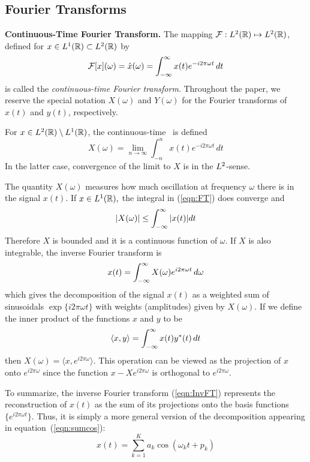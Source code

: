 \subsection{Fourier Transforms}
\label{sec:Fourier}
\begin{define}{\bf Continuous-Time Fourier Transform. } 
The mapping $\mathcal{F}: L^2(\mathbb{R}) \mapsto L^2(\mathbb{R})$, defined for
$x\in L^1(\mathbb{R}) \subset L^2(\mathbb{R})$ by
\begin{equation}
\label{eqn:FT}
\mathcal{F}[x](\omega) = \hat{x}(\omega) = \int_{-\infty}^{\infty} x(t) e^{-i2\pi\omega t}\,dt
\end{equation}
is called the \emph{continuous-time Fourier transform}.  Throughout
the paper, we reserve the special notation $X(\omega)$ and $Y(\omega)$
for the Fourier transforms of $x(t)$ and $y(t)$, respectively.

For $x \in L^2(\mathbb{R}) \setminus L^1(\mathbb{R})$, the continuous-time \FT\ is defined
\[
X(\omega) = 
\lim_{n\rightarrow \infty}\int_{-n}^n x(t) e^{-i2\pi\omega t}\, dt
\]
In the latter case, convergence of the limit to $X$ is in the
$L^2$-sense.
\end{define}
The quantity $X(\omega)$ measures how much oscillation at
frequency $\omega$ there is in the signal $x(t)$.
If $x \in L^1(\mathbb{R}),$ the integral in (\ref{eqn:FT}) does converge and 
\[|X(\omega)| \leq \int_{-\infty}^{\infty} |x(t)|dt \]
Therefore $X$ is bounded and it is a continuous function of $\omega.$
If $X$ is also integrable, the inverse Fourier transform is 
\begin{equation}
\label{eqn:InvFT}
x(t) = %
\integral X(\omega) e^{i2\pi\omega t} \,d\omega
\end{equation}
which gives the decomposition of the signal $x(t)$ as a weighted sum of sinusoidals
$\exp\{i2\pi\omega t\}$ with weights (amplitudes) given by $X(\omega)$.
If we define the inner product of the functions $x$ and $y$ to be
\[
\langle x,y \rangle = \int_{-\infty}^{\infty} x(t) y^*(t)\,dt
\]
then $X(\omega) = \langle x,e^{i2\pi\omega} \rangle$.  This operation can
be viewed as the projection of $x$ onto $e^{i2\pi\omega}$ since 
the function $x - X e^{i2\pi\omega}$ is orthogonal to
$e^{i2\pi\omega}$. 

To summarize, the inverse Fourier transform (\ref{eqn:InvFT})
represents the reconstruction of $x(t)$ as the sum of its projections
onto the basis functions $\{e^{i2\pi\omega t}\}$.  Thus, it is simply a
more general version of the decomposition appearing in
equation~(\ref{eqn:sumcos}): 
\[
x(t) = \sum_{k=1}^K a_k \cos(\omega_k t + p_k)
\]

